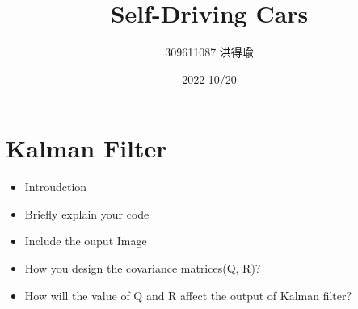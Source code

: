 \documentclass{article}
\title{Self-Driving Cars}
\author{309611087 洪得瑜}
\date{2022 10/20}
\begin{document}
\maketitle
\section{Kalman Filter}
\begin{itemize}
	\item Introudction
	\item Briefly explain your code
	\item Include the ouput Image
	\item How you design the covariance matrices(Q, R)?
	\item How will the value of Q and R affect the output of Kalman filter?
\end{itemize}
\end{document}
